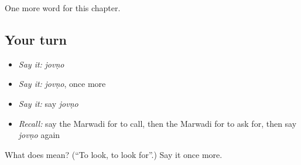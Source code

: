 \begin{grammarlens}[title={What you've built}]
One more word for this chapter.
\end{grammarlens}

\subsection*{Your turn}
\begin{itemize}
\raggedright
  \item \emph{Say it:} \emph{jovṇo}
  \item \emph{Say it:} \emph{jovṇo}, once more
  \item \emph{Say it:} say \emph{jovṇo}
  \item \emph{Recall:} say the Marwadi for to call, then the Marwadi for to ask for, then say \emph{jovṇo} again
\end{itemize}

\begin{tcolorbox}[breakable,colback=teal!4,colframe=teal!35!black,title={Before you move on}]
What does  mean? (\textquotedblleft{}To look, to look for\textquotedblright{}.) Say it once more.
\end{tcolorbox}

